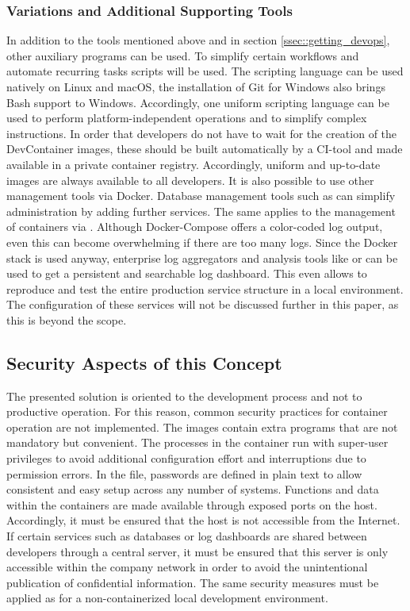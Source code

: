         \subsubsection{Variations and Additional Supporting Tools}
        In addition to the tools mentioned above and in section \ref{ssec::getting_devops}, other auxiliary programs can be used. To simplify certain workflows and automate recurring tasks scripts will be used. The  scripting language can be used natively on Linux and macOS, the installation of Git for Windows also brings Bash support to Windows. Accordingly, one uniform scripting language can be used to perform platform-independent operations and to simplify complex instructions. In order that developers do not have to wait for the creation of the DevContainer images, these should be built automatically by a \ac{CI}-tool and made available in a private container registry. Accordingly, uniform and up-to-date images are always available to all developers. \newline
        It is also possible to use other management tools via Docker. Database management tools such as  can simplify administration by adding further services. The same applies to the management of containers via . Although Docker-Compose offers a color-coded log output, even this can become overwhelming if there are too many logs. Since the Docker stack is used anyway, enterprise log aggregators and analysis tools like  or  can be used to get a persistent and searchable log dashboard. This even allows to reproduce and test the entire production service structure in a local environment. The configuration of these services will not be discussed further in this paper, as this is beyond the scope.

    \subsection{Security Aspects of this Concept}\label{ssec::sec}
    The presented solution is oriented to the development process and not to productive operation. For this reason, common security practices for container operation are not implemented. The images contain extra programs that are not mandatory but convenient. The processes in the container run with super-user privileges to avoid additional configuration effort and interruptions due to permission errors. In the  file, passwords are defined in plain text to allow consistent and easy setup across any number of systems. Functions and data within the containers are made available through exposed ports on the host. Accordingly, it must be ensured that the host is not accessible from the Internet. If certain services such as databases or log dashboards are shared between developers through a central server, it must be ensured that this server is only accessible within the company network in order to avoid the unintentional publication of confidential information. The same security measures must be applied as for a non-containerized local development environment.

